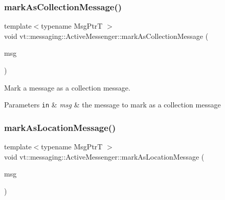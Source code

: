 \mbox{\label{structvt_1_1messaging_1_1_active_messenger_a0587ea992b0f1b06da38d52a3851aae5}} 
\subsubsection{\texorpdfstring{mark\+As\+Collection\+Message()}{markAsCollectionMessage()}}
{\footnotesize\ttfamily template$<$typename Msg\+PtrT $>$ \\
void vt\+::messaging\+::\+Active\+Messenger\+::mark\+As\+Collection\+Message (\begin{DoxyParamCaption}\item[{Msg\+PtrT const}]{msg }\end{DoxyParamCaption})}



Mark a message as a collection message. 


\begin{DoxyParams}[1]{Parameters}
\mbox{\tt in}  & {\em msg} & the message to mark as a collection message \\
\hline
\end{DoxyParams}
\mbox{\label{structvt_1_1messaging_1_1_active_messenger_ae813b0555258b09de8fa324ed98dcd02}} 
\subsubsection{\texorpdfstring{mark\+As\+Location\+Message()}{markAsLocationMessage()}}
{\footnotesize\ttfamily template$<$typename Msg\+PtrT $>$ \\
void vt\+::messaging\+::\+Active\+Messenger\+::mark\+As\+Location\+Message (\begin{DoxyParamCaption}\item[{Msg\+PtrT const}]{msg }\end{DoxyParamCaption})}




